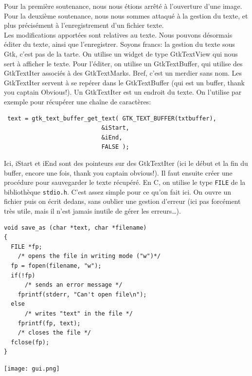 \documentclass[a4paper,12pt]{report}
\begin{document}
Pour la premi\`ere soutenance, nous nous \'etions arr\^et\'e \`a l'ouverture d'une image.\\
Pour la deuxi\`eme soutenance, nous nous sommes attaqu\'e \`a la gestion du texte, et plus pr\'ecis\'ement \`a l'enregistrement d'un fichier texte.\\
Les modifications apport\'ees sont relatives au texte. Nous pouvons d\'esormais \'editer du texte, ainsi que l'enregistrer. Soyons francs: la gestion du texte sous Gtk, c'est pas de la tarte. On utilise un widget de type GtkTextView qui nous sert \`a afficher le texte. Pour l'\'editer, on utilise un GtkTextBuffer, qui utilise des GtkTextIter associ\'es \`a des GtkTextMarks. Bref, c'est un merdier sans nom.
Les GtkTextIter servent \`a se rep\'erer dans le GtkTextBuffer (qui est un buffer, thank you captain Obvious!). Un GtkTextIter est un endroit du texte. On l'utilise par exemple pour r\'ecup\'erer une cha\^ine de caract\`eres:
\begin{lstlisting}
 text = gtk_text_buffer_get_text( GTK_TEXT_BUFFER(txtbuffer), 
                            &iStart, 
                            &iEnd, 
                            FALSE );
\end{lstlisting}
Ici, iStart et iEnd sont des pointeurs sur des GtkTextIter (ici le d\'ebut et la fin du buffer, encore une fois, thank you captain obvious!).
Il faut ensuite cr\'eer une proc\'edure pour sauvegarder le texte r\'ecup\'er\'e. En C, on utilise le type \verb!FILE! de la biblioth\`eque \verb!stdio.h!. C'est assez simple pour ce qu'on fait ici. On ouvre un fichier puis on \'ecrit dedans, sans oublier une gestion d'erreur (ici pas forc\'ement tr\`es utile, mais il n'est jamais inutile de g\'erer les erreurs\ldots).

\begin{lstlisting}
void save_as (char *text, char *filename)
{
  FILE *fp;
    /* opens the file in writing mode ("w")*/
  fp = fopen(filename, "w");
  if(!fp)
      /* sends an error message */
    fprintf(stderr, "Can't open file\n");
  else
      /* writes "text" in the file */
    fprintf(fp, text);
    /* closes the file */
  fclose(fp);
}
\end{lstlisting}

\begin{center}

	\texttt{[image: gui.png]}\\
	\caption{\emph{Notre magnifique interface graphique, telle qu'on l'avait pr\'esent\'ee lors de la deuxi\`eme soutenance}}\\
\end{center}
\end{document}
